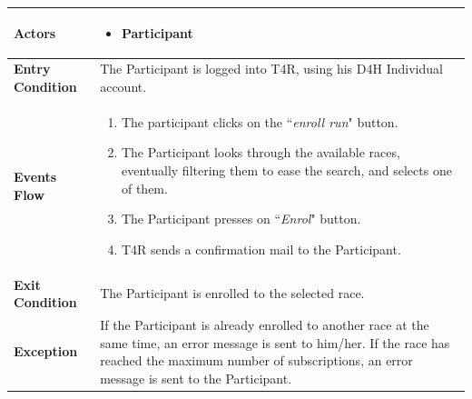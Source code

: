             \begin{table}[H]
            	\centering
                
                \begin{tabular}{|p{3cm}|p{8.2cm}|}
                    \hline
                    \textbf{Actors} & \begin{itemize}
                        \item Participant
                    \end{itemize} \\
                     \hline
                    \textbf{Entry Condition} & The Participant is logged into T4R, using his D4H Individual account. \\
                     \hline
                    \textbf{Events Flow} & \begin{enumerate}
                                                \item The participant clicks on the ``\emph{enroll run}" button.
                                                \item The Participant looks through the available races, eventually filtering them to ease the search, and selects one of them.
                                                \item The Participant presses on ``\emph{Enrol}" button.
                                                \item T4R sends a confirmation mail to the Participant.
                                            \end{enumerate}\\
                     \hline
                    \textbf{Exit Condition} & The Participant is enrolled to the selected race.\\
                     \hline
                    \textbf{Exception} & If the Participant is already enrolled to another race at the same time, an                          error message is sent to him/her. \newline
                                         If the race has reached the maximum number of subscriptions, an error message is sent to the Participant. \\
                     \hline
                \end{tabular}  
            \end{table}            
            
